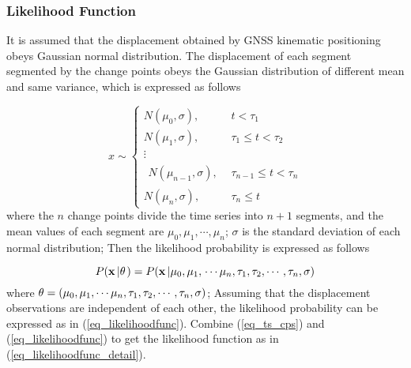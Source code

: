 \documentclass[journal]{IEEEtran}
\begin{document}
\subsubsection{Likelihood Function}
It is assumed that the displacement obtained by GNSS kinematic positioning obeys Gaussian normal distribution.  The displacement of each segment segmented by the change points obeys the Gaussian distribution of different mean and same variance, which is expressed as follows

\begin{equation}\label{eq_ts_cps}
x \sim \left\{ {\begin{array}{*{20}{r}}
	{N({\mu _0},\sigma ),}&{t < {\tau _1}}\\
	{N({\mu _1},\sigma ),}&{{\tau _1} \le t < {\tau _2}}\\
	\vdots &{}\\
	{\begin{array}{*{20}{c}}
		{N({\mu _{n-1}},\sigma ),}
		\end{array}}&{{\tau _{n - 1}} \le t < {\tau _n}}\\
	{N({\mu _{n}},\sigma ),}&{{\tau _n} \le t}
	\end{array}} \right.
\end{equation}
where the $n$ change points divide the time series into $n+1$ segments, and the mean values of each segment are ${\mu _0},{\mu _1},\cdots,{\mu _n}$; $\sigma$ is the standard deviation of each normal distribution; Then the likelihood probability is expressed as follows

\begin{equation}\label{eq_likelihood}
P({\bf{x}}\left| {\bf{\theta }} \right.) = P({\bf{x}}\left| {{\mu_0},{\mu_1},} \right. \cdots {\mu_n},{\tau _1},{\tau _2}, \cdots ,{\tau _n},\sigma )
\end{equation}
where ${\bf{\theta }}=({{\mu_0},{\mu_1},} \cdots {\mu_n},{\tau _1},{\tau _2}, \cdots ,{\tau _n},\sigma) $; Assuming that the displacement observations are independent of each other, the likelihood probability can be expressed as in (\ref{eq_likelihoodfunc}).
Combine (\ref{eq_ts_cps}) and (\ref{eq_likelihoodfunc}) to get the likelihood function as in (\ref{eq_likelihoodfunc_detail}).
\end{document}
